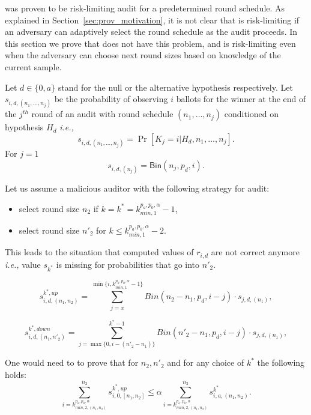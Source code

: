 

\Minerva was proven to be risk-limiting audit for a predetermined round schedule.
As explained in Section~\ref{sec:prov_motivation}, it is not clear that \Minerva is risk-limiting if an adversary can 
adaptively select the round schedule as the audit proceeds. In this section we prove that \Providence does not have this problem, and is risk-limiting even when the adversary can choose next round sizes based on knowledge of the current sample. 

\begin{definition}
Let $d \in \{0, a\}$ stand for the null or the alternative hypothesis respectively.
Let $s_{i, d, (n_1, \ldots, n_j)}$ be the probability of observing $i$ ballots for the winner at the end of the $j^{th}$ round of an audit with round schedule $(n_1, \ldots, n_j)$ conditioned on hypothesis $H_d$ \textit{i.e.,} 
\[
s_{i, d, (n_1, \ldots, n_j)} = \Pr\left[K_j = i | H_d, n_1, \ldots, n_j\right]. 
\]
For $j = 1$ 
\[
 s_{i, d, (n_j)} = \mathsf{Bin}(n_j, p_d, i).
\]
\end{definition}


\begin{example} 
Let us assume a malicious auditor with the following strategy for \Minerva audit:
\begin{itemize}
 \item select round size $n_2$ if $k = k^* = k^{p_a, p_0, \alpha}_{min, 1} - 1$,
 \item select round size $n'_2$ for $k \leq k^{p_a, p_0, \alpha}_{min, 1} - 2$.
\end{itemize}
This leads to the situation that computed values of $r_{i, d}$ are not correct anymore \textit{i.e.,} value $s_{k^*}$ is missing for probabilities that go into $n'_2$.

\[
 s^{k^*, up}_{i, d, (n_1, n_{2})} = \sum_{j = x}^{\min\{i, k^{p_a, p_0, \alpha}_{min, 1}-1\}} Bin(n_{2} - n_1, p_d, i - j) \cdot s_{j, d, (n_1)},
\]

\[
 s^{k^*, down}_{i, d, (n_1, n'_{2})} = \sum_{j = \max\{0, i - (n'_2 - n_1)\}}^{k^*-1} Bin(n'_{2} - n_1, p_d, i - j) \cdot s_{j, d, (n_1)},
\]

One would need to to prove that for $n_2, n'_2$ and for any choice of $k^*$ the following holds:
\[
\sum_{i = k^{p_a, p_0, \alpha}_{min, 2, (n_1, n_2)}}^{n_2} s^{k^*, up}_{i, 0, [n_1, n_2]} \le \alpha \sum_{i = k^{p_a, p_0, \alpha}_{min, 2, (n_1, n_2)}}^{n_2} s^{k^*}_{i, a, (n_1, n_2)}.
\]
\end{example}

